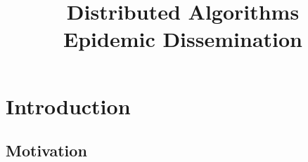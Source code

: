 
\title[DS - Epidemic Dissemination]{\textbf{Distributed Algorithms}\\Epidemic Dissemination}



\newcommand{\Value}{\mathit{value}}
\newcommand{\Time}{\fontvar{time}}
\newcommand{\Now}{\fontproc{now}}
\newcommand{\Random}{\fontproc{random}}
\newcommand{\Update}{\textsc{update}\xspace}
\newcommand{\Push}{\textsc{push}\xspace}
\newcommand{\Pull}{\textsc{pull}\xspace}
\newcommand{\ReplyPull}{\textsc{reply}\xspace}
\newcommand{\PushPull}{\textsc{pushpull}\xspace}
\newcommand{\ReplyPushPull}{\textsc{reply}\xspace}


\FrameTitle
\FrameContent

\section{Introduction}

\subsection{Motivation}

